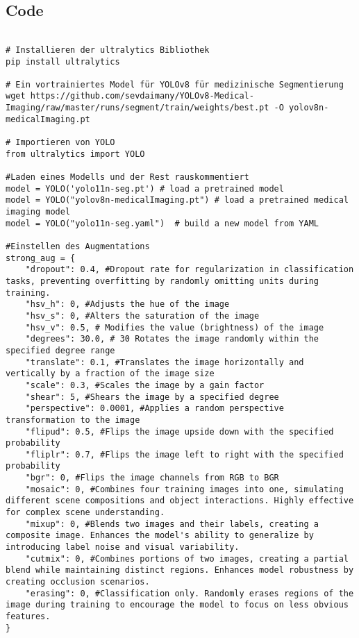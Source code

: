 \documentclass[
	german,
	accentcolor=10c,%
	type=intern,
	marginpar=false
	]{tudapub}
\begin{document}
\subsection{Code}
\begin{verbatim}

# Installieren der ultralytics Bibliothek
pip install ultralytics

# Ein vortrainiertes Model für YOLOv8 für medizinische Segmentierung
wget https://github.com/sevdaimany/YOLOv8-Medical-Imaging/raw/master/runs/segment/train/weights/best.pt -O yolov8n-medicalImaging.pt

# Importieren von YOLO
from ultralytics import YOLO

#Laden eines Modells und der Rest rauskommentiert
model = YOLO('yolo11n-seg.pt') # load a pretrained model 
model = YOLO("yolov8n-medicalImaging.pt") # load a pretrained medical imaging model
model = YOLO("yolo11n-seg.yaml")  # build a new model from YAML

#Einstellen des Augmentations
strong_aug = {
    "dropout": 0.4, #Dropout rate for regularization in classification tasks, preventing overfitting by randomly omitting units during training.
    "hsv_h": 0, #Adjusts the hue of the image
    "hsv_s": 0, #Alters the saturation of the image
    "hsv_v": 0.5, # Modifies the value (brightness) of the image
    "degrees": 30.0, # 30 Rotates the image randomly within the specified degree range
    "translate": 0.1, #Translates the image horizontally and vertically by a fraction of the image size
    "scale": 0.3, #Scales the image by a gain factor
    "shear": 5, #Shears the image by a specified degree
    "perspective": 0.0001, #Applies a random perspective transformation to the image
    "flipud": 0.5, #Flips the image upside down with the specified probability
    "fliplr": 0.7, #Flips the image left to right with the specified probability
    "bgr": 0, #Flips the image channels from RGB to BGR
    "mosaic": 0, #Combines four training images into one, simulating different scene compositions and object interactions. Highly effective for complex scene understanding.
    "mixup": 0, #Blends two images and their labels, creating a composite image. Enhances the model's ability to generalize by introducing label noise and visual variability.
    "cutmix": 0, #Combines portions of two images, creating a partial blend while maintaining distinct regions. Enhances model robustness by creating occlusion scenarios.
    "erasing": 0, #Classification only. Randomly erases regions of the image during training to encourage the model to focus on less obvious features.
}


\end{verbatim}
\end{document}
